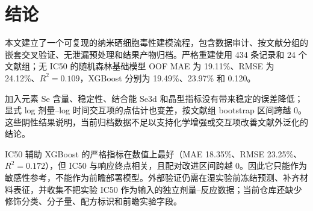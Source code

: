 \section{结论}

本文建立了一个可复现的纳米硒细胞毒性建模流程，包含数据审计、按文献分组的嵌套交叉验证、无泄漏预处理和结果产物归档。严格重建使用 434 条记录和 24 个文献组；无 IC50 的随机森林基础模型 OOF MAE 为 19.11\%、RMSE 为 24.12\%、$R^2=0.109$，XGBoost 分别为 19.49\%、23.97\% 和 0.120。

加入元素 Se 含量、稳定性、结合能 Se3d 和晶型指标没有带来稳定的误差降低；显式 log 剂量--log 时间交互项的点估计也变差，按文献组 bootstrap 区间跨越 0。这些阴性结果说明，当前归档数据不足以支持化学增强或交互项改善文献外泛化的结论。

IC50 辅助 XGBoost 的严格指标在数值上最好（MAE 18.35\%、RMSE 23.25\%、$R^2=0.172$），但 IC50 与响应终点相关，且配对改进区间跨越 0。因此它只能作为敏感性参考，不能作为前瞻部署模型。外部验证仍需在湿实验前冻结预测、补齐材料表征，并收集不把实验 IC50 作为输入的独立剂量--反应数据；当前仓库还缺少修饰分类、分子量、配方标识和前瞻实验字段。
